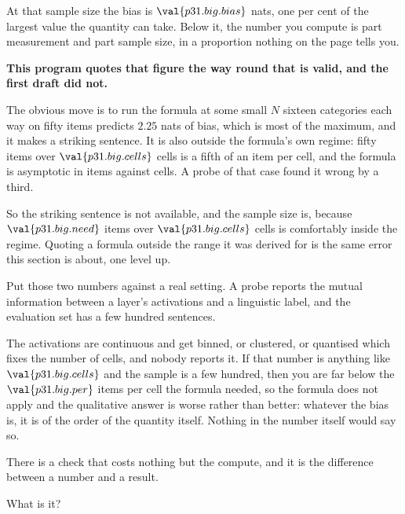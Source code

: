 \begin{fr}

At that sample size the bias is $\val{p31.big.bias}$ nats, one per cent of
the largest value the quantity can take. Below it, the number you compute is
part measurement and part sample size, in a proportion nothing on the page
tells you.

\begin{warning}
\textbf{This program quotes that figure the way round that is valid, and the
first draft did not.}

The obvious move is to run the formula at some small $N$ \dash{} sixteen
categories each way on fifty items predicts $\num{2.25}$ nats of bias, which
is most of the maximum, and it makes a striking sentence. It is also outside
the formula's own regime: fifty items over $\val{p31.big.cells}$ cells is a
fifth of an item per cell, and the formula is asymptotic in items against
cells. A probe of that case found it wrong by a third.

So the striking sentence is not available, and the sample size is, because
$\val{p31.big.need}$ items over $\val{p31.big.cells}$ cells is comfortably
inside the regime. Quoting a formula outside the range it was derived for is
the same error this section is about, one level up.
\end{warning}
\end{fr}

\begin{fr}
\begin{aibox}
Put those two numbers against a real setting. A probe reports the mutual
information between a layer's activations and a linguistic label, and the
evaluation set has a few hundred sentences.

The activations are continuous and get binned, or clustered, or quantised
\dash{} which fixes the number of cells, and nobody reports it. If that
number is anything like $\val{p31.big.cells}$ and the sample is a few
hundred, then you are far below the $\val{p31.big.per}$ items per cell the
formula needed, so the formula does not apply and the qualitative answer is
worse rather than better: whatever the bias is, it is of the order of the
quantity itself. Nothing in the number itself would say so.

There is a check that costs nothing but the compute, and it is the difference
between a number and a result.
\end{aibox}

What is it?
\dotline
\nextframe
\end{fr}

